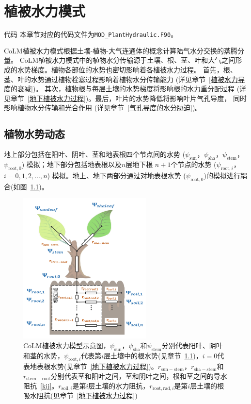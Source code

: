 \chapter{植被水力模式}
\begin{mymdframed}{代码}
  本章节对应的代码文件为\texttt{MOD\_PlantHydraulic.F90}。
\end{mymdframed}

CoLM植被水力模式根据土壤-植物-大气连通体的概念计算陆气水分交换的蒸腾分量。
CoLM植被水力模式中的植物水分传输源于土壤、根、茎、叶和大气之间形成的水势梯度。植物各部位的水势也密切影响着各植被水力过程。
首先，根、茎、叶的水势通过植物栓塞过程影响着植物水分传输能力 (详见章节~\ref{植被水力导度的衰减})。
其次，植物根与每层土壤的水势梯度将影响根的水力重分配过程 (详见章节~\ref{地下植被水力过程})。最后，叶片的水势降低将影响叶片气孔导度，
同时影响植物水分传输和光合作用 (详见章节~\ref{气孔导度的水分胁迫})。


\section{植物水势动态}\label{植物水势动态}
地上部分包括在阳叶、阴叶、茎和地表根四个节点间的水势 ($\psi_{\mathrm{sun}}$，$\psi_{\mathrm{sha}}$，$\psi_{\mathrm{stem}}$，$\psi_{\mathrm{root,0}}$)
%
模拟；地下部分包括地表根以及$n$层地下根 $n+1$个节点的水势 ($\psi_{\mathrm{root},i}$，$i=0,1,2,\ldots,n$) 模拟。地上、地下两部分通过对地表根水势
($\psi_{\mathrm{root,0}}$)的模拟进行耦合(如图~\ref{fig:CoLM植被水力模型示意图})。

{
  \begin{figure}[htb]
    \centering
    \includegraphics[width=0.6\textwidth]{Figures/植被水力模式/CoLM植被水力模型示意图.png}
    \caption[CoLM植被水力模型示意图]{CoLM植被水力模型示意图，$\psi_{\mathrm{sun}}$，$\psi_{\mathrm{sha}}$和$\psi_{\mathrm{stem}}$分别代表阳叶、阴叶和茎的水势，$\psi_{\mathrm{root},i}$代表第$i$层土壤中的根水势(见章节~\ref{植物水势动态})，$i=0$代表地表根水势(见章节~\ref{地下植被水力过程})。$r_{\mathrm{sun-stem}}$，$r_{\mathrm{sha-stem}}$和$r_{\mathrm{stem-root}}$分别代表茎和阳叶之间，茎和阴叶之间，根和茎之间的导水阻抗~\eqref{kij}。$r_{\mathrm{soil},i}$是第$i$层土壤的水力阻抗，$r_{\mathrm{root,rad},i}$是第$i$层土壤的根吸水阻抗(见章节~\ref{地下植被水力过程})}
    \label{fig:CoLM植被水力模型示意图}
  \end{figure}
}


